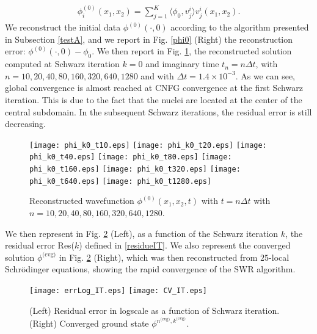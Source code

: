 \begin{eqnarray*}
\phi_i^{(0)}(x_1,x_2)  = \sum_{j=1}^K\langle \phi_0,v_j^{i}\rangle v^i_{j}(x_1,x_2).
\end{eqnarray*}
We reconstruct the initial data $\phi^{(0)}(\cdot,0)$ according to the algorithm presented in Subsection \ref{testA}, and we report in Fig. \ref{phi0} (Right) the reconstruction error: $\phi^{(0)}(\cdot,0) - \phi_0$. We then report in Fig. \ref{phi0t}, the reconstructed solution computed at Schwarz iteration $k=0$ and imaginary time $t_n=n\Delta t$, with $n=10,20,40,80,160,320,640,1280$ and with $\Delta t=1.4\times 10^{-3}$. As we can see, global convergence is almost reached at CNFG convergence at the first Schwarz iteration. This is due to the fact that the nuclei are located at the center of the central subdomain. In the subsequent Schwarz iterations, the residual error is still decreasing.
\begin{figure}[!ht]
\begin{center}
\hspace*{1mm}\texttt{[image: phi\_k0\_t10.eps]}
\hspace*{1mm}\texttt{[image: phi\_k0\_t20.eps]}
\hspace*{1mm}\texttt{[image: phi\_k0\_t40.eps]}
\hspace*{1mm}\texttt{[image: phi\_k0\_t80.eps]}
\hspace*{1mm}\texttt{[image: phi\_k0\_t160.eps]}
\hspace*{1mm}\texttt{[image: phi\_k0\_t320.eps]}
\hspace*{1mm}\texttt{[image: phi\_k0\_t640.eps]}
\hspace*{1mm}\texttt{[image: phi\_k0\_t1280.eps]}
\caption{Reconstructed wavefunction $\phi^{(0)}(x_1,x_2,t)$ with $t=n\Delta t$ with  $n=10,20,40,80,160,320,640,1280$.}
\label{phi0t}
\end{center}
\end{figure}
We then represent in Fig. \ref{CV_IT} (Left), as a function of the Schwarz iteration $k$, the residual error Res($k$) defined in \eqref{residueIT}. We also represent the converged solution $\phi^{\textrm{(cvg)}}$ in Fig. \ref{CV_IT} (Right), which was then reconstructed from $25$-local Schr\"odinger equations, showing the rapid convergence of the SWR algorithm.
\begin{figure}[!ht]
\begin{center}
\hspace*{1mm}\texttt{[image: errLog\_IT.eps]}
\hspace*{1mm}\texttt{[image: CV\_IT.eps]}
\caption{(Left) Residual error in logscale as a function of Schwarz iteration. (Right) Converged ground state $\phi^{n^{\textrm{(cvg)}},k^\textrm{(cvg)}}$.}
\label{CV_IT}
\end{center}
\end{figure}
